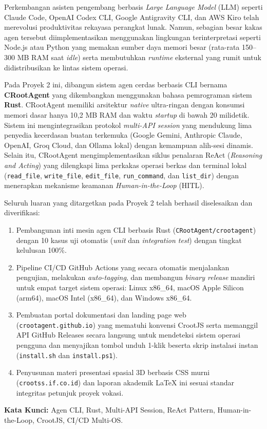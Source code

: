 Perkembangan asisten pengembang berbasis \textit{Large Language Model} (LLM) seperti Claude Code, OpenAI Codex CLI, Google Antigravity CLI, dan AWS Kiro telah merevolusi produktivitas rekayasa perangkat lunak. Namun, sebagian besar kakas agen tersebut diimplementasikan menggunakan lingkungan terinterpretasi seperti Node.js atau Python yang memakan sumber daya memori besar (rata-rata 150--300 MB RAM saat \textit{idle}) serta membutuhkan \textit{runtime} eksternal yang rumit untuk didistribusikan ke lintas sistem operasi.

Pada Proyek 2 ini, dibangun sistem agen cerdas berbasis CLI bernama \textbf{CRootAgent} yang dikembangkan menggunakan bahasa pemrograman sistem \textbf{Rust}. CRootAgent memiliki arsitektur \textit{native} ultra-ringan dengan konsumsi memori dasar hanya 10,2 MB RAM dan waktu \textit{startup} di bawah 20 milidetik. Sistem ini mengintegrasikan protokol \textit{multi-API session} yang mendukung lima penyedia kecerdasan buatan terkemuka (Google Gemini, Anthropic Claude, OpenAI, Groq Cloud, dan Ollama lokal) dengan kemampuan alih-sesi dinamis. Selain itu, CRootAgent mengimplementasikan siklus penalaran ReAct (\textit{Reasoning and Acting}) yang dilengkapi lima perkakas operasi berkas dan terminal lokal (\texttt{read\_file}, \texttt{write\_file}, \texttt{edit\_file}, \texttt{run\_command}, dan \texttt{list\_dir}) dengan menerapkan mekanisme keamanan \textit{Human-in-the-Loop} (HITL).

Seluruh luaran yang ditargetkan pada Proyek 2 telah berhasil diselesaikan dan diverifikasi:
\begin{enumerate}[noitemsep]
    \item Pembangunan inti mesin agen CLI berbasis Rust (\texttt{CRootAgent/crootagent}) dengan 10 kasus uji otomatis (\textit{unit} dan \textit{integration test}) dengan tingkat kelulusan 100\%.
    \item Pipeline CI/CD GitHub Actions yang secara otomatis menjalankan pengujian, melakukan \textit{auto-tagging}, dan membangun \textit{binary release} mandiri untuk empat target sistem operasi: Linux x86\_64, macOS Apple Silicon (arm64), macOS Intel (x86\_64), dan Windows x86\_64.
    \item Pembuatan portal dokumentasi dan landing page web (\texttt{crootagent.github.io}) yang mematuhi konvensi CrootJS serta memanggil API GitHub Releases secara langsung untuk mendeteksi sistem operasi pengguna dan menyajikan tombol unduh 1-klik beserta skrip instalasi instan (\texttt{install.sh} dan \texttt{install.ps1}).
    \item Penyusunan materi presentasi spasial 3D berbasis CSS murni (\texttt{crootss.if.co.id}) dan laporan akademik LaTeX ini sesuai standar integritas petunjuk proyek vokasi.
\end{enumerate}

\textbf{Kata Kunci:} Agen CLI, Rust, Multi-API Session, ReAct Pattern, Human-in-the-Loop, CrootJS, CI/CD Multi-OS.
